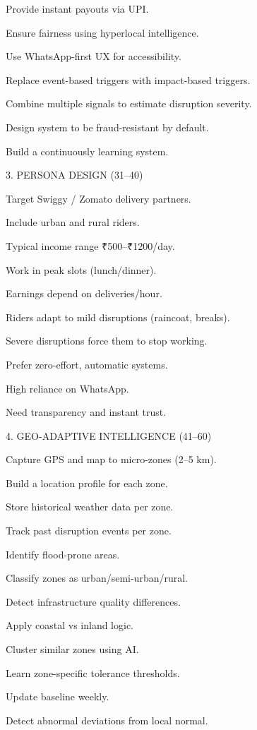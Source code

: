 Provide instant payouts via UPI. 

Ensure fairness using hyperlocal intelligence. 

Use WhatsApp-first UX for accessibility. 

Replace event-based triggers with impact-based triggers. 

Combine multiple signals to estimate disruption severity. 

Design system to be fraud-resistant by default. 

Build a continuously learning system. 

 

 3. PERSONA DESIGN (31–40) 

Target Swiggy / Zomato delivery partners. 

Include urban and rural riders. 

Typical income range ₹500–₹1200/day. 

Work in peak slots (lunch/dinner). 

Earnings depend on deliveries/hour. 

Riders adapt to mild disruptions (raincoat, breaks). 

Severe disruptions force them to stop working. 

Prefer zero-effort, automatic systems. 

High reliance on WhatsApp. 

Need transparency and instant trust. 

 

 4. GEO-ADAPTIVE INTELLIGENCE (41–60) 

Capture GPS and map to micro-zones (2–5 km). 

Build a location profile for each zone. 

Store historical weather data per zone. 

Track past disruption events per zone. 

Identify flood-prone areas. 

Classify zones as urban/semi-urban/rural. 

Detect infrastructure quality differences. 

Apply coastal vs inland logic. 

Cluster similar zones using AI. 

Learn zone-specific tolerance thresholds. 

Update baseline weekly. 

Detect abnormal deviations from local normal. 

